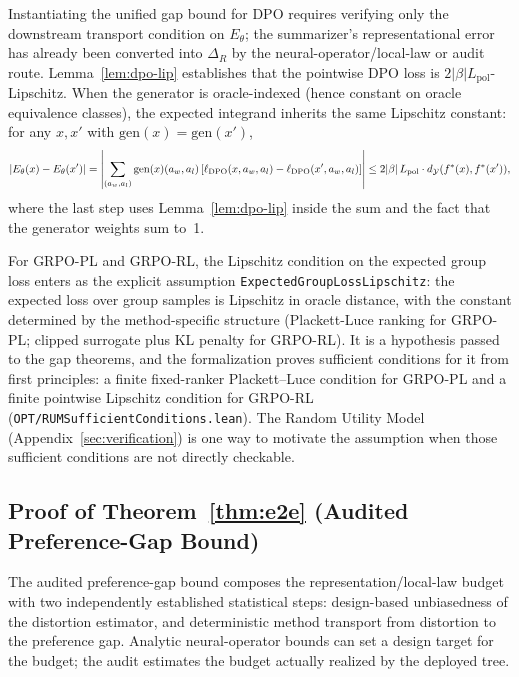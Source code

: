 Instantiating the unified gap bound for DPO requires verifying only the downstream transport condition on $E_\theta$; the summarizer's representational error has already been converted into $\Delta_R$ by the neural-operator/local-law or audit route. Lemma~\ref{lem:dpo-lip} establishes that the pointwise DPO loss is $2|\beta|L_{\mathrm{pol}}$-Lipschitz. When the generator is oracle-indexed (hence constant on oracle equivalence classes), the expected integrand inherits the same Lipschitz constant: for any $x, x'$ with $\mathrm{gen}(x) = \mathrm{gen}(x')$,
\[
|E_\theta(x) - E_\theta(x')| = \left|\sum_{(a_w, a_l)} \mathrm{gen}(x)(a_w, a_l)\, [\ell_{\mathrm{DPO}}(x, a_w, a_l) - \ell_{\mathrm{DPO}}(x', a_w, a_l)]\right| \le 2|\beta|\,L_{\mathrm{pol}} \cdot d_{\mathcal{Y}}(f^\ast(x), f^\ast(x')),
\]
where the last step uses Lemma~\ref{lem:dpo-lip} inside the sum and the fact that the generator weights sum to~1.

For GRPO-PL and GRPO-RL, the Lipschitz condition on the expected group loss enters as the explicit assumption \texttt{ExpectedGroupLossLipschitz}: the expected loss over group samples is Lipschitz in oracle distance, with the constant determined by the method-specific structure (Plackett-Luce ranking for GRPO-PL; clipped surrogate plus KL penalty for GRPO-RL). It is a hypothesis passed to the gap theorems, and the formalization proves sufficient conditions for it from first principles: a finite fixed-ranker Plackett--Luce condition for GRPO-PL and a finite pointwise Lipschitz condition for GRPO-RL (\texttt{OPT/RUMSufficientConditions.lean}). The Random Utility Model (Appendix~\ref{sec:verification}) is one way to motivate the assumption when those sufficient conditions are not directly checkable.

\subsection{Proof of Theorem~\ref{thm:e2e} (Audited Preference-Gap Bound)}\label{app:proof-e2e}

The audited preference-gap bound composes the representation/local-law budget with two independently established statistical steps: design-based unbiasedness of the distortion estimator, and deterministic method transport from distortion to the preference gap. Analytic neural-operator bounds can set a design target for the budget; the audit estimates the budget actually realized by the deployed tree.

